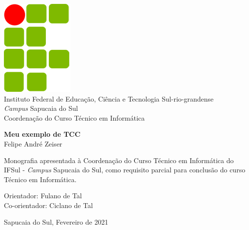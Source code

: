 \documentclass[portuguese,12pt,oneside,a4paper]{book}
\begin{document}
\thispagestyle{empty}
\begin{center}
    \includegraphics[scale=0.4]{ifsul} \\
    \Large Instituto Federal de Educação, Ciência e Tecnologia Sul-rio-grandense\\
    \textit{Campus} Sapucaia do Sul\\
    Coordenação do Curso Técnico em Informática\\

    \vspace*{4cm}

    \textbf{\LARGE{Meu exemplo de TCC}}\\
    
    \vspace*{2cm}
    \Large{Felipe André Zeiser}
    
    \vskip 1.5cm
\end{center}    
    


    \begin{flushright} 
		\begin{minipage}[left]{0.5\linewidth}
	
			Monografia apresentada à Coordenação do Curso Técnico em Informática do IFSul - \textit{Campus} Sapucaia do Sul, como requisito parcial para conclusão do curso Técnico em Informática.\\                                                                
			
		\end{minipage}
                  
   	\end{flushright}                                


\begin{center}    

    \vskip 2cm
    Orientador: Fulano de Tal\\
    Co-orientador: Ciclano de Tal
    \vskip 1.0cm

    \normalsize{Sapucaia do Sul, Fevereiro de 2021}
\end{center}
\end{document}
